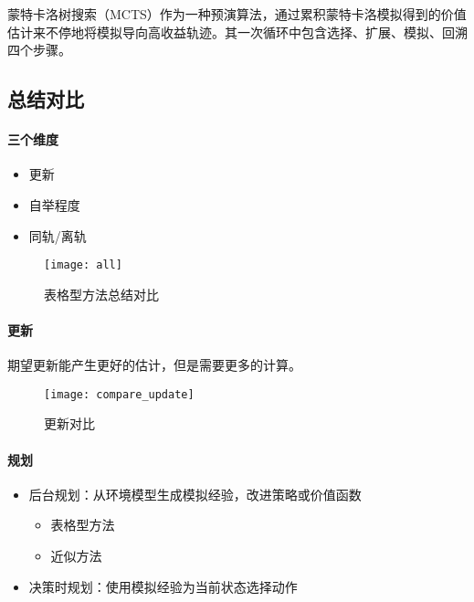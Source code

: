 \documentclass[
12pt, %
a4paper, 
oneside, %
headinclude,footinclude, %
]{scrartcl}
\begin{document}
蒙特卡洛树搜索（MCTS）作为一种预演算法，通过累积蒙特卡洛模拟得到的价值估计来不停地将模拟导向高收益轨迹。其一次循环中包含选择、扩展、模拟、回溯四个步骤。
\subsection{总结对比}
\begin{minipage}{0.3\textwidth}
\paragraph{三个维度}   
\begin{itemize}
\item 更新
\item 自举程度
\item 同轨/离轨
\end{itemize}
\end{minipage}
\hfill
\begin{minipage}{0.6\textwidth}
\begin{figure}[H]
\centering
\texttt{[image: all]}
\caption[表格型方法总结对比]{表格型方法总结对比}
\end{figure}
\end{minipage}
\paragraph{更新}
期望更新能产生更好的估计，但是需要更多的计算。

\begin{figure}[H]
\centering
\texttt{[image: compare\_update]}
\caption[表格型方法更新对比]{更新对比}
\end{figure}
\paragraph{规划}
\begin{itemize}
\item 后台规划：从环境模型生成模拟经验，改进策略或价值函数
\begin{itemize}
\item 表格型方法
\item 近似方法
\end{itemize}
\item 决策时规划：使用模拟经验为当前状态选择动作
\end{itemize}
\end{document}
